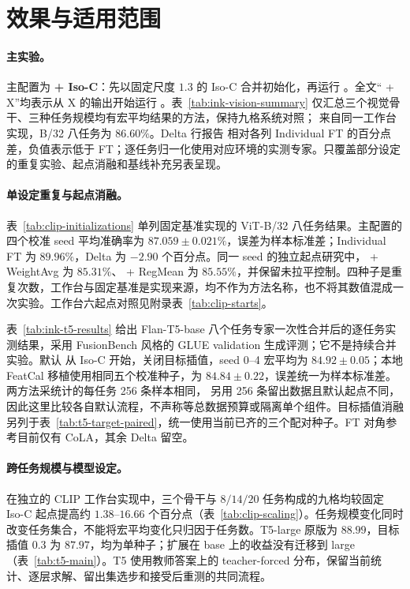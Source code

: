 \section{效果与适用范围}
\label{sec:experiments}

\paragraph{主实验。}
主配置为 \textbf{\method{} + Iso-C}：先以固定尺度 $1.3$ 的 Iso-C 合并初始化，再运行 \method{}。全文“\method{} + X”均表示从 X 的输出开始运行 \method{}。表~\ref{tab:ink-vision-summary} 仅汇总三个视觉骨干、三种任务规模均有宏平均结果的方法，保持九格系统对照；\method{} 来自同一工作台实现，B/32 八任务为 $86.60\%$。Delta 行报告 \method{} 相对各列 Individual FT 的百分点差，负值表示低于 FT；逐任务归一化使用对应环境的实测专家。只覆盖部分设定的重复实验、起点消融和基线补充另表呈现。



\paragraph{单设定重复与起点消融。}
表~\ref{tab:clip-initializations} 单列固定基准实现的 ViT-B/32 八任务结果。主配置的四个校准 seed 平均准确率为 $87.059\pm0.021\%$，误差为样本标准差；Individual FT 为 $89.96\%$，Delta 为 $-2.90$ 个百分点。同一 seed 的独立起点研究中，\method{} + WeightAvg 为 $85.31\%$、\method{} + RegMean 为 $85.55\%$，并保留未拉平控制。四种子是重复次数，工作台与固定基准是实现来源，均不作为方法名称，也不将其数值混成一次实验。工作台六起点对照见附录表~\ref{tab:clip-starts}。



表~\ref{tab:ink-t5-results} 给出 Flan-T5-base 八个任务专家一次性合并后的逐任务实测结果，采用 FusionBench 风格的 GLUE validation 生成评测；它不是持续合并实验。默认 \method{} 从 Iso-C 开始，关闭目标插值，seed 0--4 宏平均为 $84.92\pm0.05$；本地 FeatCal 移植使用相同五个校准种子，为 $84.84\pm0.22$，误差统一为样本标准差。两方法采统计的每任务 256 条样本相同，\method{} 另用 256 条留出数据且默认起点不同，因此这里比较各自默认流程，不声称等总数据预算或隔离单个组件。目标插值消融另列于表~\ref{tab:t5-target-paired}，统一使用当前已齐的三个配对种子。FT 对角参考目前仅有 CoLA，其余 Delta 留空。



\paragraph{跨任务规模与模型设定。}
在独立的 CLIP 工作台实现中，三个骨干与 $8/14/20$ 任务构成的九格均较固定 Iso-C 起点提高约 $1.38$--$16.66$ 个百分点（表~\ref{tab:clip-scaling}）。任务规模变化同时改变任务集合，不能将宏平均变化只归因于任务数。T5-large 原版为 $88.99$，目标插值 $0.3$ 为 $87.97$，均为单种子；扩展在 base 上的收益没有迁移到 large（表~\ref{tab:t5-main}）。T5 使用教师答案上的 teacher-forced 分布，保留当前统计、逐层求解、留出集选步和接受后重测的共同流程。

